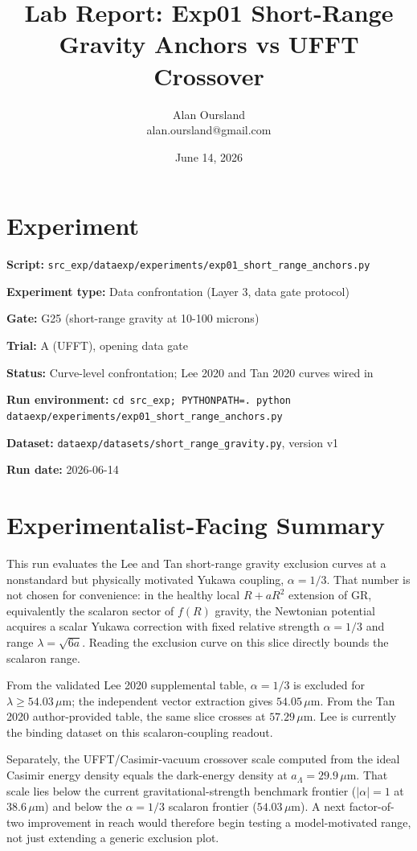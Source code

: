 \documentclass{article}
\title{Lab Report: Exp01 Short-Range Gravity Anchors vs UFFT Crossover}
\author{Alan Oursland \\ alan.oursland@gmail.com}
\date{June 14, 2026}
\begin{document}
\maketitle

\section{Experiment}

\textbf{Script:} \texttt{src\_exp/dataexp/experiments/exp01\_short\_range\_anchors.py}

\textbf{Experiment type:} Data confrontation (Layer 3, data gate protocol)

\textbf{Gate:} G25 (short-range gravity at 10-100 microns)

\textbf{Trial:} A (UFFT), opening data gate

\textbf{Status:} Curve-level confrontation; Lee 2020 and Tan 2020 curves wired in

\textbf{Run environment:} \texttt{cd src\_exp; PYTHONPATH=. python dataexp/experiments/exp01\_short\_range\_anchors.py}

\textbf{Dataset:} \texttt{dataexp/datasets/short\_range\_gravity.py}, version v1

\textbf{Run date:} 2026-06-14

\section{Experimentalist-Facing Summary}

This run evaluates the Lee and Tan short-range gravity exclusion curves at a
nonstandard but physically motivated Yukawa coupling, $\alpha=1/3$. That
number is not chosen for convenience: in the healthy local $R+aR^2$
extension of GR, equivalently the scalaron sector of $f(R)$ gravity, the
Newtonian potential acquires a scalar Yukawa correction with fixed relative
strength $\alpha=1/3$ and range $\lambda=\sqrt{6a}$. Reading the exclusion
curve on this slice directly bounds the scalaron range.

From the validated Lee 2020 supplemental table, $\alpha=1/3$ is excluded for
$\lambda\ge54.03\,\mu$m; the independent vector extraction gives
$54.05\,\mu$m. From the Tan 2020 author-provided table, the same slice crosses
at $57.29\,\mu$m. Lee is currently the binding dataset on this scalaron-coupling
readout.

Separately, the UFFT/Casimir-vacuum crossover scale computed from the ideal
Casimir energy density equals the dark-energy density at
$a_\Lambda=29.9\,\mu$m. That scale lies below the current
gravitational-strength benchmark frontier ($|\alpha|=1$ at $38.6\,\mu$m) and
below the $\alpha=1/3$ scalaron frontier ($54.03\,\mu$m). A next factor-of-two
improvement in reach would therefore begin testing a model-motivated range,
not just extending a generic exclusion plot.
\end{document}
